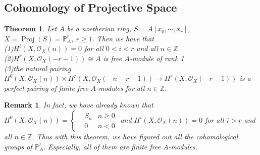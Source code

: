 \documentclass{ctexart}
\newtheorem{remark}{Remark}[section]
\newtheorem{theorem}{Theorem}[section]
\newcommand{\proj}{\operatorname{Proj}}
\begin{document}
\subsection{Cohomology of Projective Space}
\label{subsection:Cohomology of Projective Space}
\begin{theorem}
    Let $A$ be a noetherian ring, $S= A[x_{0}, \cdots, x_{r}]$, $X = \proj(S) = \mathbb{P}_{A}^{r}$, $r \ge 1$.
    Then we have that \\ 
    (1)$H^{i}(X, \mathcal{O}_{X}(n)) = 0$ for all $0 < i < r$ and all $n\in \mathbb{Z}$ \\
    (2)$H^{r}(X, \mathcal{O}_{X}(-r - 1)) \cong A$ is free $A$-module of rank 1 \\
    (3)the natural pairing $H^{0}(X, \mathcal{O}_{X}(n)) \times H^{r}(X, \mathcal{O}_{X}(-n - r - 1)) \longrightarrow H^{r}(X, \mathcal{O}_{X}(-r - 1))$ is a perfect pairing of finite free $A$-modules for all $n\in \mathbb{Z}$.
    \label{Theorem 7.6}
\end{theorem}
\begin{remark}
    In fact, we have already known that $H^{0}(X, \mathcal{O}_{X}(n)) =
    \left\{
        \begin{aligned}
            & S_{n} & n \ge 0 \\
            & 0 & n < 0
        \end{aligned}
    \right.$
    and $H^{i}(X, \mathcal{O}_{X}(n)) = 0$ for all $i > r$ and all $n\in \mathbb{Z}$.
    Thus with this theorem, we have figured out all the cohomological groups of $\mathbb{P}_{A}^{r}$.
    Especially, all of them are finite free $A$-modules.
\end{remark}
\end{document}
